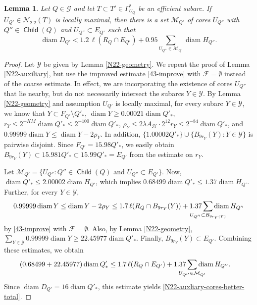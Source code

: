 \documentclass[12pt]{amsart}
\numberwithin{equation}{section}
\theoremstyle{plain}
\newtheorem{lemma}[theorem]{Lemma}
\theoremstyle{definition}
\newcommand{\diam}{\mathop\mathrm{diam}\nolimits}
\newcommand{\Child}{\mathop\mathsf{Child}\nolimits}
\numberwithin{figure}{section}
\begin{document}
\begin{lemma}\label{N22-better} Let $Q\in\mathscr{G}$ and let $T\subset T'\in\Gamma^*_{U_Q}$ be an efficient subarc. If $U_{Q'}\in\mathcal{N}_{2.2}(T)$ is locally maximal, then there is a set $\mathcal{M}_{Q'}$ of cores $U_{Q''}$ with $Q''\in\Child(Q)$ and $U_{Q''} \subset E_{Q'}$ such that \begin{equation}\label{N22-auxliary-cores-better-total}
\diam D_{Q'} < 1.2\,\ell(R_Q\cap E_{Q'}) + 0.95 \sum_{U_{Q''}\in\mathcal{M}_{Q'}}\diam H_{Q''}.\end{equation}
\end{lemma}

\begin{proof} Let $\mathcal{Y}$ be given by Lemma \ref{N22-geometry}. We repeat the proof of Lemma \ref{N22-auxiliary}, but use the improved estimate \eqref{43-improve} with $\mathcal{F}=\emptyset$ instead of the coarse estimate. In effect, we are incorporating the existence of cores $U_{Q''}$ that lie nearby, but do not necessarily intersect the subarcs $Y\in\mathcal{Y}$. By Lemma \ref{N22-geometry} and assumption $U_{Q'}$ is locally maximal, for every subarc $Y\in\mathcal{Y}$, we know that $Y\subset F_{Q'}\setminus Q'_*$, $\diam Y\geq 0.00021\diam Q'_*$, $r_Y\leq 2^{-KM}\diam Q'_*\leq 2^{-100}\diam Q'_*$, $\rho_Y \leq 2\lambda A_\mathscr{H}\cdot 2^{12}r_Y \leq 2^{-84}\diam Q'_*$, and $0.99999\diam Y\leq \diam Y-2\rho_Y$. In addition, $\{1.00002Q'_*\}\cup\{B_{9r_Y}(Y):Y\in\mathcal{Y}\}$ is pairwise disjoint. Since $F_{Q'}=15.98Q'_*$, we easily obtain $B_{9r_Y}(Y)\subset 15.981Q'_*\subset 15.99Q'_*=E_{Q'}$ from the estimate on $r_Y$.

Let $\mathcal{M}_{Q'}=\{U_{Q''}:Q''\in\Child(Q)\text{ and } U_{Q''}\subset E_{Q'}\}.$ Now, $\diam Q'_*\leq 2.00002\diam H_{Q'}$, which implies $0.68499\diam Q'_*\leq 1.37\diam H_{Q'}$. Further, for every $Y\in\mathcal{Y}$, \begin{equation*}
0.99999\diam Y\leq \diam Y - 2\rho_Y \leq 1.7\,\ell(R_Q\cap B_{9r_Y}(Y)) + 1.37 \sum_{\mathclap{U_{Q''}\subset B_{9r_Y(Y)}}}\diam H_{Q''}\end{equation*} by \eqref{43-improve} with $\mathcal{F}=\emptyset$. Also, by Lemma \ref{N22-geometry}, $\sum_{Y\in\mathcal{Y}} 0.99999\diam Y\geq 22.45977\diam Q'_*$. Finally, $B_{9r_Y}(Y)\subset E_{Q'}$. Combining these estimates, we obtain
\begin{align*}
    (0.68499+22.45977)\diam Q'_* & \le 1.7\,\ell(R_Q\cap E_{Q'}) + 1.37 \sum_{\mathclap{U_{Q''}\in\mathcal{M}_{Q'}}} \diam H_{Q''}.
\end{align*}
Since $\diam D_{Q'}=16\diam Q'_*$, this estimate yields \eqref{N22-auxliary-cores-better-total}.
\end{proof}
\end{document}
